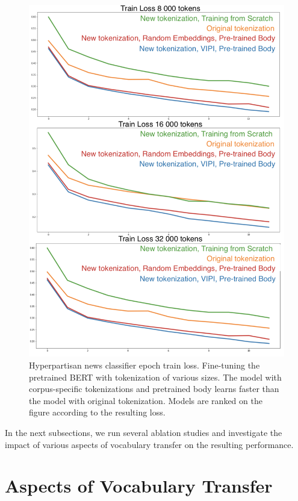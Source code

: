 \documentclass[review]{elsarticle}
\begin{document}
\begin{figure}
\begin{multicols}{2}
      \includegraphics[scale=0.295]{Hex.png}
  \caption{Hyperpartisan news classifier epoch train loss. Fine-tuning the pretrained BERT with tokenization of various sizes. The model with corpus-specific tokenizations and pretrained body learns faster than the model with original tokenization. Models are ranked on the figure according to the resulting loss.}
  \label{fig:H}
\end{multicols}
\end{figure}


In the next subsections, we run several ablation studies and investigate the impact of various aspects of vocabulary transfer on the resulting performance.

\section{Aspects of Vocabulary Transfer}
\end{document}
